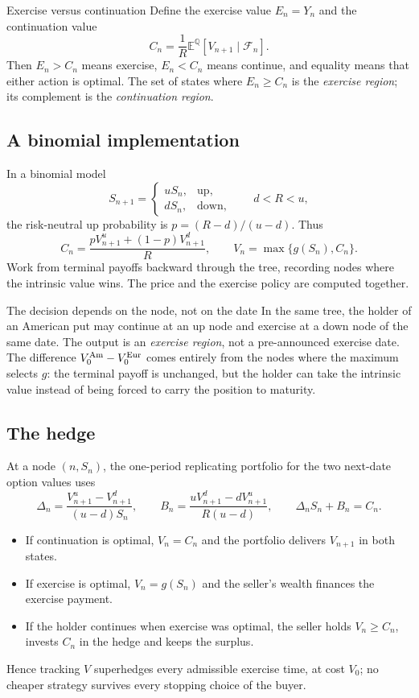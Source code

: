 \documentclass[10pt]{article}
\newcommand{\E}{\mathbb E}
\newcommand{\Q}{\mathbb Q}
\newcommand{\1}{\mathbf 1}
\newcommand{\cF}{\mathcal F}
\theoremstyle{definition}
\begin{document}
\begin{assumptionbox}{Exercise versus continuation}
Define the exercise value \(E_n=Y_n\) and the continuation value
\[
C_n=\frac1R\E^\Q[V_{n+1}\mid\cF_n].
\]
Then \(E_n>C_n\) means exercise, \(E_n<C_n\) means continue, and equality
means that either action is optimal. The set of states where \(E_n\geq C_n\)
is the \emph{exercise region}; its complement is the \emph{continuation
region}.
\end{assumptionbox}

\subsection{A binomial implementation}

In a binomial model
\[
S_{n+1}=\begin{cases}uS_n,&\text{up},\\dS_n,&\text{down},\end{cases}
\qquad d<R<u,
\]
the risk-neutral up probability is \(p=(R-d)/(u-d)\). Thus
\[
C_n=\frac{pV_{n+1}^{u}+(1-p)V_{n+1}^{d}}{R},
\qquad V_n=\max\{g(S_n),C_n\}.
\]
Work from terminal payoffs backward through the tree, recording nodes where
the intrinsic value wins. The price and the exercise policy are computed
together.

\begin{keyidea}{The decision depends on the node, not on the date}
In the same tree, the holder of an American put may continue at an up node
and exercise at a down node of the same date. The output is an
\emph{exercise region}, not a pre-announced exercise date. The difference
\(V_0^{\rm Am}-V_0^{\rm Eur}\) comes entirely from the nodes where the
maximum selects \(g\): the terminal payoff is unchanged, but the holder can
take the intrinsic value instead of being forced to carry the position to
maturity.
\end{keyidea}

\subsection{The hedge}

At a node \((n,S_n)\), the one-period replicating portfolio for the two
next-date option values uses
\[
\Delta_n=\frac{V_{n+1}^u-V_{n+1}^d}{(u-d)S_n},\qquad
B_n=\frac{uV_{n+1}^d-dV_{n+1}^u}{R(u-d)},\qquad
\Delta_nS_n+B_n=C_n.
\]
\begin{itemize}
\item If continuation is optimal, \(V_n=C_n\) and the portfolio delivers
      \(V_{n+1}\) in both states.
\item If exercise is optimal, \(V_n=g(S_n)\) and the seller's wealth
      finances the exercise payment.
\item If the holder continues when exercise was optimal, the seller holds
      \(V_n\geq C_n\), invests \(C_n\) in the hedge and keeps the surplus.
\end{itemize}
Hence tracking \(V\) superhedges every admissible exercise time, at cost
\(V_0\); no cheaper strategy survives every stopping choice of the buyer.
\end{document}
